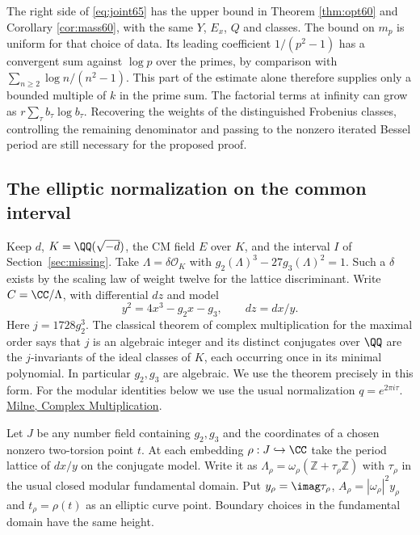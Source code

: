 \documentclass[a4paper,11pt]{article}
\theoremstyle{definition}
\theoremstyle{remark}
\newcommand{\ZZ}{\mathbb Z}\newcommand{\ord}{\operatorname{ord}}
\numberwithin{equation}{section}
\begin{document}
The right side of \eqref{eq:joint65} has the upper bound in
Theorem \ref{thm:opt60} and Corollary \ref{cor:mass60}, with the same \(Y\), \(E_x\), \(Q\) and classes.
The bound on \(m_p\) is uniform for that choice of data. Its
leading coefficient \(1/(p^2-1)\) has a convergent sum against
\(\log p\) over the primes, by comparison with
\(\sum_{n\ge2}\log n/(n^2-1)\). This part of the estimate alone
therefore supplies only a bounded multiple of \(k\) in the
prime sum. The factorial terms at infinity can grow as
\(r\sum_\tau b_\tau\log b_\tau\). Recovering the weights of the
distinguished Frobenius classes, controlling the remaining
denominator and passing to the nonzero iterated Bessel period
are still necessary for the proposed proof.

\subsection{The elliptic normalization on the common interval}\label{nav:V-20}
Keep \(d\), \(K=\QQ(\sqrt{-d})\), the CM field \(E\) over \(K\),
and the interval \(I\) of Section~\ref{sec:missing}. Take
\(\Lambda=\delta\mathcal O_K\) with
\(g_2(\Lambda)^3-27g_3(\Lambda)^2=1\). Such a \(\delta\) exists
by the scaling law of weight twelve for the lattice discriminant.
Write \(C=\CC/\Lambda\), with differential \(dz\) and model
\[
                y^2=4x^3-g_2x-g_3,\qquad dz=dx/y.
\]
Here \(j=1728g_2^3\). The classical theorem of complex
multiplication for the maximal order says that \(j\) is an
algebraic integer and its distinct conjugates over \(\QQ\) are the
\(j\)-invariants of the ideal classes of \(K\), each occurring once
in its minimal polynomial. In particular \(g_2,g_3\) are algebraic.
We use the theorem precisely in this form. For the modular
identities below we use the usual normalization \(q=e^{2\pi i\tau}\).
\href{https://www.jmilne.org/math/CourseNotes/CM.pdf}{Milne, Complex Multiplication}.

Let \(J\) be any number field containing \(g_2,g_3\) and the
coordinates of a chosen nonzero two-torsion point \(t\).
At each embedding \(\rho:J\hookrightarrow\CC\) take the period
lattice of \(dx/y\) on the conjugate model. Write it as
\(\Lambda_\rho=\omega_\rho(\ZZ+\tau_\rho\ZZ)\) with
\(\tau_\rho\) in the usual closed modular fundamental domain.
Put \(y_\rho=\imag\tau_\rho\), \(A_\rho=|\omega_\rho|^2 y_\rho\)
and \(t_\rho=\rho(t)\) as an elliptic curve point. Boundary choices
in the fundamental domain have the same height.
\end{document}

